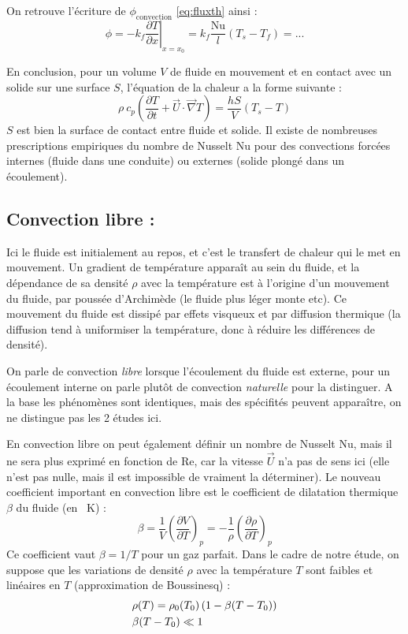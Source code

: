 On retrouve l'écriture de $\phi_{\text{convection}}$ \eqref{eq:fluxth} ainsi :
%
\begin{equation}
    \phi = - k_f \left. \frac{\partial{T}}{\partial{x}} \right|_{x=x_0}
         = k_f \frac{\mathrm{Nu}}{l} \left( T_s - T_f \right)
         = ...
\end{equation}

En conclusion, pour un volume $V$ de fluide en mouvement et en contact avec un solide sur une surface $S$, l'équation de la chaleur a la forme suivante :
%
\begin{equation}
    \rho~c_p \left( \frac{\partial T}{\partial t}
    + \vec{U} \cdot \vec{\nabla} T \right)
    = \frac{h S}{V} \left( T_s - T \right)
\end{equation}
%
$S$ est bien la surface de contact entre fluide et solide. Il existe de nombreuses prescriptions empiriques du nombre de Nusselt $\mathrm{Nu}$ pour des convections forcées internes (fluide dans une conduite) ou externes (solide plongé dans un écoulement).


\subsection{Convection libre :}
Ici le fluide est initialement au repos, et c'est le transfert de chaleur qui le met en mouvement. Un gradient de température apparaît au sein du fluide, et la dépendance de sa densité $\rho$ avec la température est à l'origine d'un mouvement du fluide, par poussée d'Archimède (le fluide plus léger monte etc). Ce mouvement du fluide est dissipé par effets visqueux et par diffusion thermique (la diffusion tend à uniformiser la température, donc à réduire les différences de densité).

On parle de convection \textit{libre} lorsque l'écoulement du fluide est externe, pour un écoulement interne on parle plutôt de convection \textit{naturelle} pour la distinguer. A la base les phénomènes sont identiques, mais des spécifités peuvent apparaître, on ne distingue pas les 2 études ici.

En convection libre on peut également définir un nombre de Nusselt Nu, mais il ne sera plus exprimé en fonction de Re, car la vitesse $\vec{U}$ n'a pas de sens ici (elle n'est pas nulle, mais il est impossible de vraiment la déterminer). Le nouveau coefficient important en convection libre est le coefficient de dilatation thermique $\beta$ du fluide (en \si{\per\kelvin}) :
%
\begin{equation}
    \beta = \frac{1}{V} \left( \frac{\partial V}{\partial T} \right)_p
          = - \frac{1}{\rho} \left( \frac{\partial \rho}{\partial T} \right)_p
\end{equation}
%
Ce coefficient vaut $\beta = 1/T$ pour un gaz parfait. Dans le cadre de notre étude, on suppose que les variations de densité $\rho$ avec la température $T$ sont faibles et linéaires en $T$ (approximation de Boussinesq) :
%
\begin{align}
    &\rho(T) = \rho_0(T_0) \left( 1 - \beta(T-T_0) \right) \\
    \notag &\beta (T-T_0) \ll 1
\end{align}

